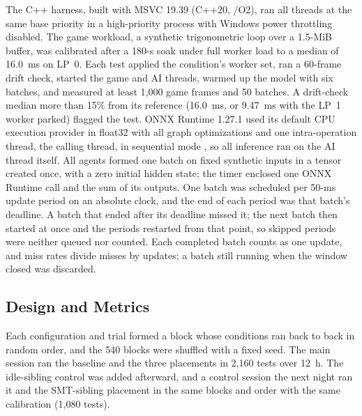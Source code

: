 \documentclass[conference]{IEEEtran}
\begin{document}
The C++ harness, built with MSVC 19.39 (C++20, /O2), ran all threads at the same base priority in a high-priority process with Windows power throttling disabled. The game workload, a synthetic trigonometric loop over a 1.5-MiB buffer, was calibrated after a 180-s soak under full worker load to a median of 16.0~ms on LP~0. Each test applied the condition's worker set, ran a 60-frame drift check, started the game and AI threads, warmed up the model with six batches, and measured at least 1,000 game frames and 50 batches. A drift-check median more than 15\% from its reference (16.0~ms, or 9.47~ms with the LP~1 worker parked) flagged the test. ONNX Runtime 1.27.1 used its default CPU execution provider in float32 with all graph optimizations and one intra-operation thread, the calling thread, in sequential mode \cite{ortthreading}, so all inference ran on the AI thread itself. All agents formed one batch on fixed synthetic inputs in a tensor created once, with a zero initial hidden state; the timer enclosed one ONNX Runtime call and the sum of its outputs. One batch was scheduled per 50-ms update period on an absolute clock, and the end of each period was that batch's deadline. A batch that ended after its deadline missed it; the next batch then started at once and the periods restarted from that point, so skipped periods were neither queued nor counted. Each completed batch counts as one update, and miss rates divide misses by updates; a batch still running when the window closed was discarded.

\subsection{Design and Metrics}
Each configuration and trial formed a block whose conditions ran back to back in random order, and the 540 blocks were shuffled with a fixed seed. The main session ran the baseline and the three placements in 2,160 tests over 12~h. The idle-sibling control was added afterward, and a control session the next night ran it and the SMT-sibling placement in the same blocks and order with the same calibration (1,080 tests).
\end{document}
